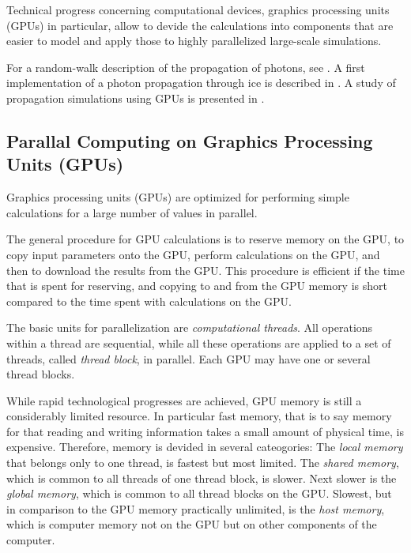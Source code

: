 Technical progress concerning computational devices, graphics processing units (GPUs) in particular, allow to devide the calculations into components that are easier to model and apply those to highly parallelized large-scale simulations.

For a random-walk description of the propagation of photons, see \cite{absorption1997}. A first implementation of a photon propagation through ice is described in \cite{lundberg}. A study of propagation simulations using GPUs is presented in \cite{ppcpaper}.


\subsection{Parallal Computing on Graphics Processing Units (GPUs)}
\label{sec:parallel_computing}

Graphics processing units (GPUs) are optimized for performing simple calculations for a large number of values in parallel.

The general procedure for GPU calculations is to reserve memory on the GPU, to copy input parameters onto the GPU, perform calculations on the GPU, and then to download the results from the GPU. This procedure is efficient if the time that is spent for reserving, and copying to and from the GPU memory is short compared to the time spent with calculations on the GPU. \cite{cudacourse}

The basic units for parallelization are \textit{computational threads}. All operations within a thread are sequential, while all these operations are applied to a set of threads, called \textit{thread block}, in parallel. Each GPU may have one or several thread blocks. \cite{cudacourse}

While rapid technological progresses are achieved, GPU memory is still a considerably limited resource. In particular fast memory, that is to say memory for that reading and writing information takes a small amount of physical time, is expensive. Therefore, memory is devided in several cateogories: The \textit{local memory} that belongs only to one thread, is fastest but most limited. The \textit{shared memory}, which is common to all threads of one thread block, is slower. Next slower is the \textit{global memory}, which is common to all thread blocks on the GPU. Slowest, but in comparison to the GPU memory practically unlimited, is the \textit{host memory}, which is computer memory not on the GPU but on other components of the computer. \cite{cudacourse}


